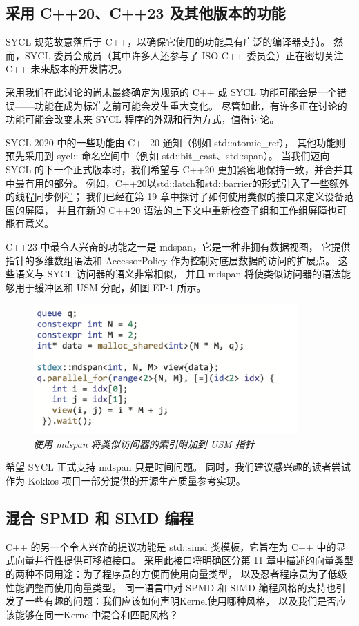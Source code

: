 \subsection{采用 C++20、C++23 及其他版本的功能}
SYCL 规范故意落后于 C++，以确保它使用的功能具有广泛的编译器支持。 
然而，SYCL 委员会成员（其中许多人还参与了 ISO C++ 委员会）正在密切关注 C++ 未来版本的开发情况。

采用我们在此讨论的尚未最终确定为规范的 C++ 或 SYCL 功能可能会是一个错误——功能在成为标准之前可能会发生重大变化。 
尽管如此，有许多正在讨论的功能可能会改变未来 SYCL 程序的外观和行为方式，值得讨论。

SYCL 2020 中的一些功能由 C++20 通知（例如 std::atomic\_ref），
其他功能则预先采用到 sycl:: 命名空间中（例如 std::bit\_cast、std::span）。 
当我们迈向 SYCL 的下一个正式版本时，我们希望与 C++20 更加紧密地保持一致，并合并其中最有用的部分。 
例如，C++20以std::latch和std::barrier的形式引入了一些额外的线程同步例程； 
我们已经在第 19 章中探讨了如何使用类似的接口来定义设备范围的屏障，
并且在新的 C++20 语法的上下文中重新检查子组和工作组屏障也可能有意义。

C++23 中最令人兴奋的功能之一是 mdspan，它是一种非拥有数据视图，
它提供指针的多维数组语法和 AccessorPolicy 作为控制对底层数据的访问的扩展点。 
这些语义与 SYCL 访问器的语义非常相似，
并且 mdspan 将使类似访问器的语法能够用于缓冲区和 USM 分配，如图 EP-1 所示。

\begin{figure}[H]
	\centering
	\includegraphics[width=0.9\textwidth]{figs/F22.1.png}
	\caption{\textit{使用 mdspan 将类似访问器的索引附加到 USM 指针 }}
\end{figure}

希望 SYCL 正式支持 mdspan 只是时间问题。 
同时，我们建议感兴趣的读者尝试作为 Kokkos 项目一部分提供的开源生产质量参考实现。

\subsection{混合 SPMD 和 SIMD 编程}
C++ 的另一个令人兴奋的提议功能是 std::simd 类模板，它旨在为 C++ 中的显式向量并行性提供可移植接口。 
采用此接口将明确区分第 11 章中描述的向量类型的两种不同用途：为了程序员的方便而使用向量类型，
以及忍者程序员为了低级性能调整而使用向量类型。 
同一语言中对 SPMD 和 SIMD 编程风格的支持也引发了一些有趣的问题：我们应该如何声明Kernel使用哪种风格，
以及我们是否应该能够在同一Kernel中混合和匹配风格？

